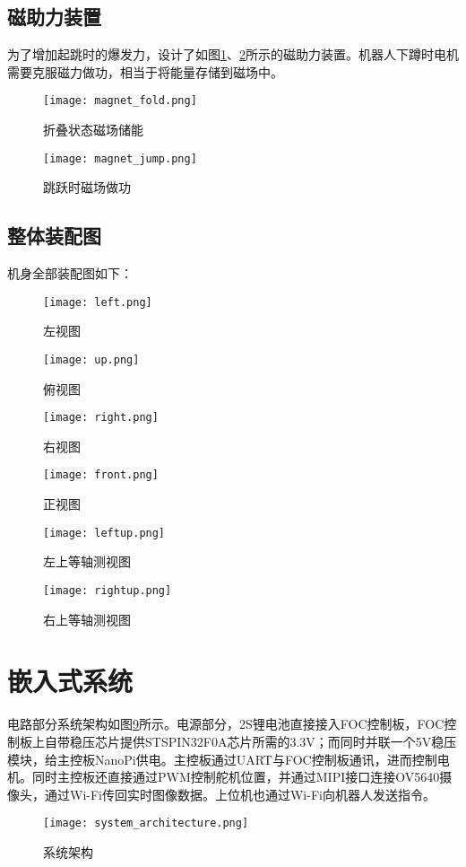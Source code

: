 \subsection{磁助力装置}
为了增加起跳时的爆发力，设计了如图\ref{fig:magnet_fold}、\ref{fig:magnet_jump}所示的磁助力装置。机器人下蹲时电机需要克服磁力做功，相当于将能量存储到磁场中。
\begin{figure}[H]
  \centering
  {\texttt{[image: magnet\_fold.png]}}
  \caption{折叠状态磁场储能}
  \label{fig:magnet_fold}
\end{figure}
\begin{figure}[H]
  \centering
  {\texttt{[image: magnet\_jump.png]}}
  \caption{跳跃时磁场做功}
  \label{fig:magnet_jump}
\end{figure}
\subsection{整体装配图}
机身全部装配图如下：
\begin{figure}[H]
  \centering
  {\texttt{[image: left.png]}}
  \caption{左视图}
  \label{fig:left}
\end{figure}
\begin{figure}[H]
  \centering
  {\texttt{[image: up.png]}}
  \caption{俯视图}
  \label{fig:up}
\end{figure}
\begin{figure}[H]
  \centering
  {\texttt{[image: right.png]}}
  \caption{右视图}
  \label{fig:right}
\end{figure}
\begin{figure}[H]
  \centering
  {\texttt{[image: front.png]}}
  \caption{正视图}
  \label{fig:front}
\end{figure}
\begin{figure}[H]
  \centering
  {\texttt{[image: leftup.png]}}
  \caption{左上等轴测视图}
  \label{fig:leftup}
\end{figure}
\begin{figure}[H]
  \centering
  {\texttt{[image: rightup.png]}}
  \caption{右上等轴测视图}
  \label{fig:rightup}
\end{figure}
\section{嵌入式系统}
电路部分系统架构如图\ref{fig:system_architecture}所示。电源部分，2S锂电池直接接入FOC控制板，FOC控制板上自带稳压芯片提供STSPIN32F0A芯片所需的3.3V；而同时并联一个5V稳压模块，给主控板NanoPi供电。主控板通过UART与FOC控制板通讯，进而控制电机。同时主控板还直接通过PWM控制舵机位置，并通过MIPI接口连接OV5640摄像头，通过Wi-Fi传回实时图像数据。上位机也通过Wi-Fi向机器人发送指令。
\begin{figure}[H]
  \centering
  {\texttt{[image: system\_architecture.png]}}
  \caption{系统架构}
  \label{fig:system_architecture}
\end{figure}
